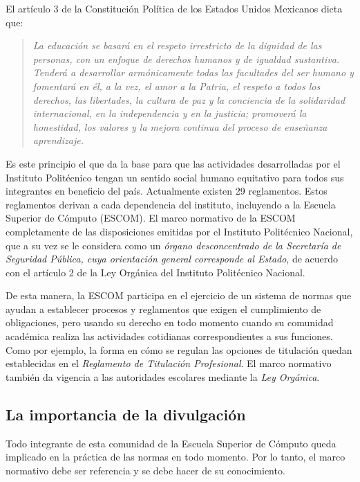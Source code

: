 El artículo 3 de la Constitución Política de los Estados Unidos Mexicanos dicta que:

\begin{quote}
    \textit{La educación se basará en el respeto irrestricto de la dignidad de las personas, con un enfoque de derechos humanos y de igualdad sustantiva. Tenderá a desarrollar armónicamente todas las facultades del ser humano y fomentará en él, a la vez, el amor a la Patria, el respeto a todos los derechos, las libertades, la cultura de paz y la conciencia de la solidaridad internacional, en la independencia y en la justicia; promoverá la honestidad, los valores y la mejora continua del proceso de enseñanza aprendizaje.}
\end{quote}

Es este principio el que da la base para que las actividades desarrolladas por el Instituto Politécnico tengan un sentido social humano equitativo para todos sus integrantes en beneficio del país. Actualmente existen 29 reglamentos. Estos reglamentos derivan a cada dependencia del instituto, incluyendo a la Escuela Superior de Cómputo (ESCOM). El marco normativo de la ESCOM completamente de las disposiciones emitidas por el Instituto Politécnico Nacional, que a su vez se le considera como un \textit{órgano desconcentrado de la Secretaría de Seguridad Pública, cuya orientación general corresponde al Estado}, de acuerdo con el artículo 2 de la Ley Orgánica del Instituto Politécnico Nacional.


De esta manera, la ESCOM participa en el ejercicio de un sistema de normas que ayudan a establecer procesos y reglamentos que exigen el cumplimiento de obligaciones, pero usando su derecho en todo momento cuando su comunidad académica realiza las actividades cotidianas correspondientes a sus funciones. Como por ejemplo, la forma en cómo se regulan las opciones de titulación quedan establecidas en el \textit{Reglamento de Titulación Profesional}. El marco normativo también da vigencia a las autoridades escolares mediante la \textit{Ley Orgánica}.

\subsection{La importancia de la divulgación}

Todo integrante de esta comunidad de la Escuela Superior de Cómputo queda implicado en la práctica de las normas en todo momento. Por lo tanto, el marco normativo debe ser referencia y se debe hacer de su conocimiento. 

